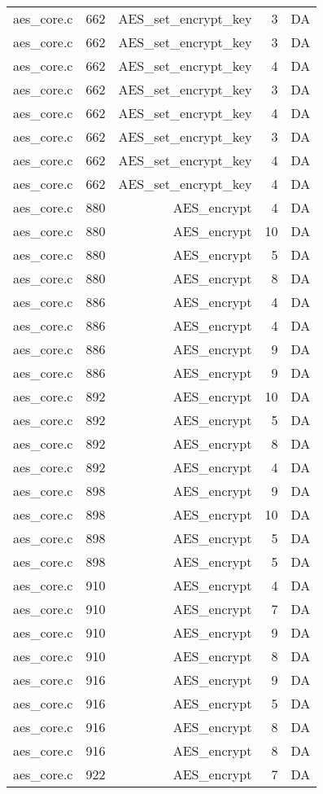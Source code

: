 \begin{table}
\begin{tabular}{clrrr}
aes\_core.c& 662&AES\_set\_encrypt\_key&3 &DA\\
aes\_core.c& 662&AES\_set\_encrypt\_key&3 &DA\\
aes\_core.c& 662&AES\_set\_encrypt\_key&4 &DA\\
aes\_core.c& 662&AES\_set\_encrypt\_key&3 &DA\\
aes\_core.c& 662&AES\_set\_encrypt\_key&4 &DA\\
aes\_core.c& 662&AES\_set\_encrypt\_key&3 &DA\\
aes\_core.c& 662&AES\_set\_encrypt\_key&4 &DA\\
aes\_core.c& 662&AES\_set\_encrypt\_key&4 &DA\\
aes\_core.c& 880&AES\_encrypt&4 &DA\\
aes\_core.c& 880&AES\_encrypt&10&DA\\
aes\_core.c& 880&AES\_encrypt&5 &DA\\
aes\_core.c& 880&AES\_encrypt&8 &DA\\
aes\_core.c& 886&AES\_encrypt&4 &DA\\
aes\_core.c& 886&AES\_encrypt&4 &DA\\
aes\_core.c& 886&AES\_encrypt&9 &DA\\
aes\_core.c& 886&AES\_encrypt&9 &DA\\
aes\_core.c& 892&AES\_encrypt&10&DA\\
aes\_core.c& 892&AES\_encrypt&5 &DA\\
aes\_core.c& 892&AES\_encrypt&8 &DA\\
aes\_core.c& 892&AES\_encrypt&4 &DA\\
aes\_core.c& 898&AES\_encrypt&9 &DA\\
aes\_core.c& 898&AES\_encrypt&10&DA\\
aes\_core.c& 898&AES\_encrypt&5 &DA\\
aes\_core.c& 898&AES\_encrypt&5 &DA\\
aes\_core.c& 910&AES\_encrypt&4 &DA\\
aes\_core.c& 910&AES\_encrypt&7 &DA\\
aes\_core.c& 910&AES\_encrypt&9 &DA\\
aes\_core.c& 910&AES\_encrypt&8 &DA\\
aes\_core.c& 916&AES\_encrypt&9 &DA\\
aes\_core.c& 916&AES\_encrypt&5 &DA\\
aes\_core.c& 916&AES\_encrypt&8 &DA\\
aes\_core.c& 916&AES\_encrypt&8 &DA\\
aes\_core.c& 922&AES\_encrypt&7 &DA\\

\end{tabular}
\end{table}
